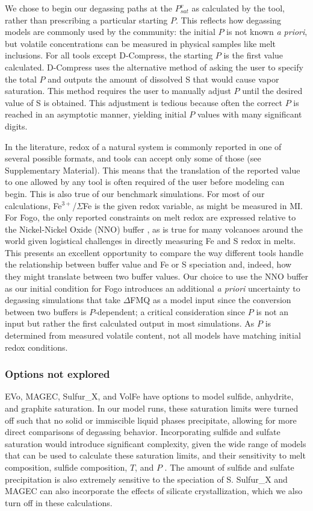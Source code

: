 \documentclass[draft, english]{volcanica-template}
\begin{document}
We chose to begin our degassing paths at the $P^v_{sat}$ as calculated by the tool, rather than prescribing a particular starting $P$. This reflects how degassing models are commonly used by the community: the initial $P$ is not known \textit{a priori}, but volatile concentrations can be measured in physical samples like melt inclusions. For all tools except D-Compress, the starting $P$ is the first value calculated. D-Compress uses the alternative method of asking the user to specify the total $P$ and outputs the amount of dissolved S that would cause vapor saturation. This method requires the user to manually adjust $P$ until the desired value of S is obtained. This adjustment is tedious because often the correct $P$ is reached in an asymptotic manner, yielding initial $P$ values with many significant digits. 

In the literature, redox of a natural system is commonly reported in one of several possible formats, and tools can accept only some of those (see Supplementary Material). This means that the translation of the reported value to one allowed by any tool is often required of the user before modeling can begin. This is also true of our benchmark simulations. For most of our calculations, Fe$^{3+}$/$\Sigma$Fe is the given redox variable, as might be measured in MI. For Fogo, the only reported constraints on melt redox are expressed relative to the Nickel-Nickel Oxide (NNO) buffer \parencite{devitre2023oceanic}, as is true for many volcanoes around the world given logistical challenges in directly measuring Fe and S redox in melts. This presents an excellent opportunity to compare the way different tools handle the relationship between buffer value and Fe or S speciation and, indeed, how they might translate between two buffer values. Our choice to use the NNO buffer as our initial condition for Fogo introduces an additional \textit{a priori} uncertainty to degassing simulations that take $\Delta$FMQ as a model input since the conversion between two buffers is $P$-dependent; a critical consideration since $P$ is not an input but rather the first calculated output in most simulations. As $P$ is determined from measured volatile content, not all models have matching initial redox conditions. 

\subsubsection{Options not explored}
\label{sec:non-explored-options}
EVo, MAGEC, Sulfur\_X, and VolFe have options to model sulfide, anhydrite, and graphite saturation. In our model runs, these saturation limits were turned off such that no solid or immiscible liquid phases precipitate, allowing for more direct comparisons of degassing behavior. Incorporating sulfide and sulfate saturation would introduce significant complexity, given the wide range of models that can be used to calculate these saturation limits, and their sensitivity to melt composition, sulfide composition, $T$, and $P$ \parencite{wieser2023pysulfsat}. The amount of sulfide and sulfate precipitation is also extremely sensitive to the speciation of S. Sulfur\_X and MAGEC can also incorporate the effects of silicate crystallization, which we also turn off in these calculations.
\end{document}
